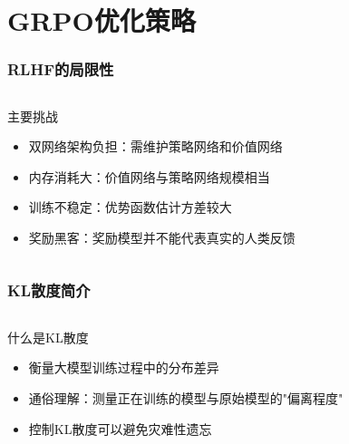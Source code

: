 \documentclass[8pt,aspectratio=169]{beamer}
\begin{document}
\section{GRPO优化策略}
\begin{frame}
    \frametitle{RLHF的局限性}
    \begin{columns}[T]
        \begin{alertblock}{主要挑战}
            \begin{itemize}
                \item 双网络架构负担：需维护策略网络和价值网络
                \item 内存消耗大：价值网络与策略网络规模相当
                \item 训练不稳定：优势函数估计方差较大
                \item 奖励黑客：奖励模型并不能代表真实的人类反馈
            \end{itemize}
        \end{alertblock}
    \end{columns}
\end{frame}

\begin{frame}
    \frametitle{KL散度简介}
    \begin{columns}[T]
        \begin{block}{什么是KL散度}
            \begin{itemize}
                \item 衡量大模型训练过程中的分布差异       
                \item 通俗理解：测量正在训练的模型与原始模型的"偏离程度"
                \item 控制KL散度可以避免灾难性遗忘
            \end{itemize}
        \end{block}
        
    \end{columns}
\end{frame}
\end{document}
